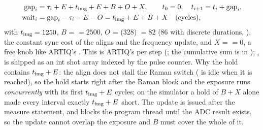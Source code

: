 \begin{align*}
  \mathrm{gap}_i &= \tau_i + E + t_{\rm img} + E + B + O + X, \qquad t_0 = 0,\quad t_{i+1} = t_i + \mathrm{gap}_i,\\
  \mathrm{wait}_i &= \mathrm{gap}_i - \tau_i - E - O = t_{\rm img} + E + B + X \quad (\text{cycles}),
\end{align*}
with $t_{\rm img} = 1250$, $B$ = 
$= 2500$, $O$ =  (328\nsu) $= 82$ (86 with
discrete durations, ), the constant
sync cost of the aligns and the frequency update, and $X$ =
 $= 0$, a free knob like ARTIQ's
. This is ARTIQ's 
per step (; the cumulative sum is
 in );
$_i$ is shipped as an int shot array indexed by the pulse
counter. Why the hold contains $t_{\rm img} + E$: the align does not stall
the Raman switch ( is idle when it is reached), so the
hold starts right after the Raman block and the exposure runs
\emph{concurrently} with its first $t_{\rm img} + E$ cycles; on the simulator a
hold of $B + X$ alone made every interval exactly $t_{\rm img} + E$ short.
The update is issued after the measure statement, and  blocks
the program thread until the ADC result exists, so the update cannot overlap
the exposure and $B$ must cover the whole of it.

